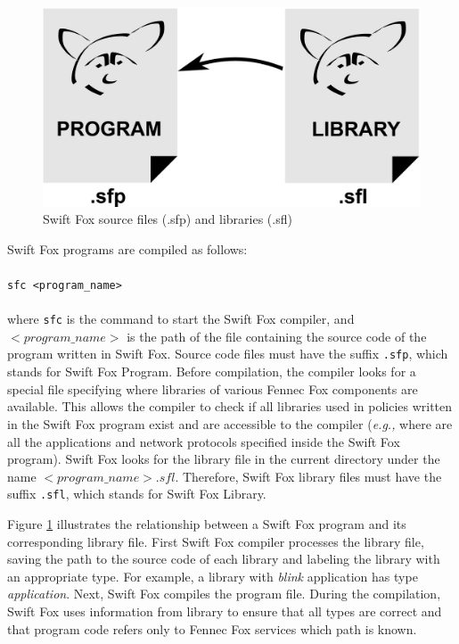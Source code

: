 \begin{figure}[htp]
\centering
        \includegraphics[scale=0.2]{fig/swift_fox_relation.eps}
        \caption{Swift Fox source files (.sfp) and libraries (.sfl)}
        \label{fig:swift_fox_relation}
\end{figure}

Swift Fox programs are compiled as follows:     			\\
\\
\texttt{sfc <program\_name>}	          				\\
\\
where \texttt{sfc} is the command to start the Swift Fox compiler, and
$<program\_name>$ is the path of the file containing the source code of the
program written in Swift Fox. Source code files must have the suffix
\texttt{.sfp}, which stands for Swift Fox Program. Before compilation, the
compiler looks for a special file specifying where libraries of various
Fennec Fox components are available. This allows the compiler to check if
all libraries used in policies written in the Swift Fox program exist and
are accessible to the compiler (\textit{e.g.,} where are all the
applications and network protocols specified inside the Swift Fox program).
Swift Fox looks for the library file in the current directory under the
name $<program\_name>.sfl$. Therefore, Swift Fox library files must have
the suffix \texttt{.sfl}, which stands for Swift Fox Library. 

Figure \ref{fig:swift_fox_relation} illustrates the relationship 
between a Swift Fox program and its corresponding library file. 
First Swift Fox compiler processes the library file, saving the path
to the source code of each library and labeling the library with
an appropriate type. For example, a library with \textit{blink} application 
has type \textit{application}. Next, Swift Fox compiles the program file.
During the compilation, Swift Fox uses information from library to
ensure that all types are correct and that program code refers only
to Fennec Fox services which path is known.



